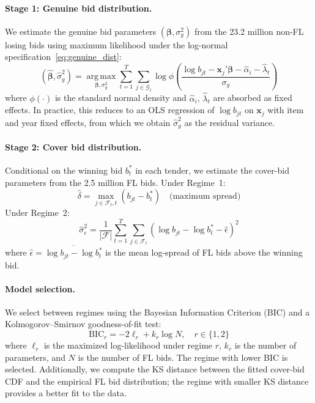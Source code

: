 \paragraph{Stage 1: Genuine bid distribution.}
We estimate the genuine bid parameters $(\boldsymbol{\beta},
\sigma_g^2)$ from the 23.2 million non-FL losing bids using maximum
likelihood under the log-normal specification~\eqref{eq:genuine_dist}:
\begin{equation}
  (\hat{\boldsymbol{\beta}}, \hat{\sigma}_g^2) =
  \operatorname*{arg\,max}_{\boldsymbol{\beta}, \sigma_g^2}
  \sum_{t=1}^{T} \sum_{j \in \mathcal{G}_t}
  \log \phi\!\left(
    \frac{\log b_{jt} - \mathbf{x}_j'\boldsymbol{\beta}
    - \hat{\alpha}_i - \hat{\lambda}_t}{\sigma_g}
  \right)
  \label{eq:mle_genuine}
\end{equation}
where $\phi(\cdot)$ is the standard normal density and
$\hat{\alpha}_i$, $\hat{\lambda}_t$ are absorbed as fixed effects.
In practice, this reduces to an OLS regression of $\log b_{jt}$ on
$\mathbf{x}_j$ with item and year fixed effects, from which we obtain
$\hat{\sigma}_g^2$ as the residual variance.

\paragraph{Stage 2: Cover bid distribution.}
Conditional on the winning bid $b^*_t$ in each tender, we estimate
the cover-bid parameters from the 2.5 million FL bids. Under
Regime~1:
\begin{equation}
  \hat{\delta} = \max_{j \in \mathcal{F}_t, t}
  (b_{jt} - b^*_t) \quad \text{(maximum spread)}
  \label{eq:mle_delta}
\end{equation}
Under Regime~2:
\begin{equation}
  \hat{\sigma}_c^2 = \frac{1}{|\mathcal{F}|}
  \sum_{t=1}^{T} \sum_{j \in \mathcal{F}_t}
  \left(\log b_{jt} - \log b^*_t - \hat{\epsilon}\right)^2
  \label{eq:mle_sigma_c}
\end{equation}
where $\hat{\epsilon} = \overline{\log b_{jt} - \log b^*_t}$ is the
mean log-spread of FL bids above the winning bid.

\paragraph{Model selection.}
We select between regimes using the Bayesian Information Criterion
(BIC) and a Kolmogorov--Smirnov goodness-of-fit test:
\begin{equation}
  \text{BIC}_r = -2\ell_r + k_r \log N, \quad r \in \{1, 2\}
  \label{eq:bic}
\end{equation}
where $\ell_r$ is the maximized log-likelihood under regime $r$,
$k_r$ is the number of parameters, and $N$ is the number of FL bids.
The regime with lower BIC is selected. Additionally, we compute the KS
distance between the fitted cover-bid CDF and the empirical FL bid
distribution; the regime with smaller KS distance provides a better
fit to the data.

